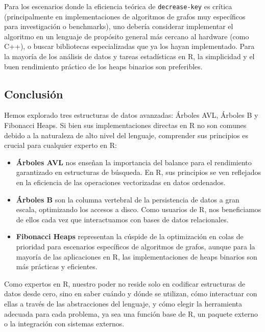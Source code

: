 \documentclass[
  spanish,
  letterpaper,
  DIV=11,
  numbers=noendperiod]{scrreprt}
\providecommand{\tightlist}{%
  \setlength{\itemsep}{0pt}\setlength{\parskip}{0pt}}
\begin{document}
Para los escenarios donde la eficiencia teórica de \texttt{decrease-key}
es crítica (principalmente en implementaciones de algoritmos de grafos
muy específicos para investigación o benchmarks), uno debería considerar
implementar el algoritmo en un lenguaje de propósito general más cercano
al hardware (como C++), o buscar bibliotecas especializadas que ya los
hayan implementado. Para la mayoría de los análisis de datos y tareas
estadísticas en R, la simplicidad y el buen rendimiento práctico de los
heaps binarios son preferibles.

\subsection{Conclusión}\label{conclusiuxf3n-4}

Hemos explorado tres estructuras de datos avanzadas: Árboles AVL,
Árboles B y Fibonacci Heaps. Si bien sus implementaciones directas en R
no son comunes debido a la naturaleza de alto nivel del lenguaje,
comprender sus principios es crucial para cualquier experto en R:

\begin{itemize}
\tightlist
\item
  \textbf{Árboles AVL} nos enseñan la importancia del balance para el
  rendimiento garantizado en estructuras de búsqueda. En R, sus
  principios se ven reflejados en la eficiencia de las operaciones
  vectorizadas en datos ordenados.
\item
  \textbf{Árboles B} son la columna vertebral de la persistencia de
  datos a gran escala, optimizando los accesos a disco. Como usuarios de
  R, nos beneficiamos de ellos cada vez que interactuamos con bases de
  datos relacionales.
\item
  \textbf{Fibonacci Heaps} representan la cúspide de la optimización en
  colas de prioridad para escenarios específicos de algoritmos de
  grafos, aunque para la mayoría de las aplicaciones en R, las
  implementaciones de heaps binarios son más prácticas y eficientes.
\end{itemize}

Como expertos en R, nuestro poder no reside solo en codificar
estructuras de datos desde cero, sino en saber cuándo y dónde se
utilizan, cómo interactuar con ellas a través de las abstracciones del
lenguaje, y cómo elegir la herramienta adecuada para cada problema, ya
sea una función base de R, un paquete externo o la integración con
sistemas externos.

\end{document}
